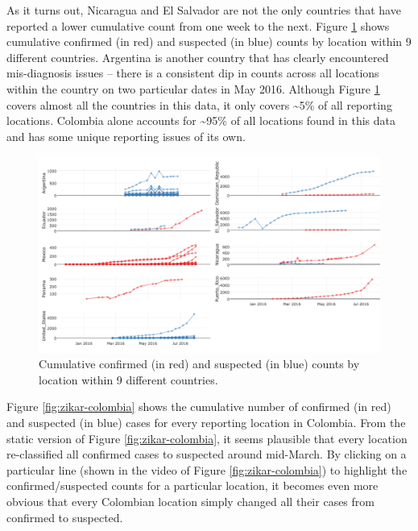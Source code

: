 \documentclass[12pt,]{article}
\theoremstyle{definition}
\theoremstyle{definition}
\theoremstyle{remark}
\begin{document}
As it turns out, Nicaragua and El Salvador are not the only countries
that have reported a lower cumulative count from one week to the next.
Figure \ref{fig:zikar-cumulative} shows cumulative confirmed (in red)
and suspected (in blue) counts by location within 9 different countries.
Argentina is another country that has clearly encountered mis-diagnosis
issues -- there is a consistent dip in counts across all locations
within the country on two particular dates in May 2016. Although Figure
\ref{fig:zikar-cumulative} covers almost all the countries in this data,
it only covers \textasciitilde{}5\% of all reporting locations. Colombia
alone accounts for \textasciitilde{}95\% of all locations found in this
data and has some unique reporting issues of its own.

\begin{figure}
\centering
\includegraphics{images/zikar-cumulative}
\caption{\label{fig:zikar-cumulative}Cumulative confirmed (in red) and
suspected (in blue) counts by location within 9 different countries.}
\end{figure}

Figure \ref{fig:zikar-colombia} shows the cumulative number of confirmed
(in red) and suspected (in blue) cases for every reporting location in
Colombia. From the static version of Figure \ref{fig:zikar-colombia}, it
seems plausible that every location re-classified all confirmed cases to
suspected around mid-March. By clicking on a particular line (shown in
the video of Figure \ref{fig:zikar-colombia}) to highlight the
confirmed/suspected counts for a particular location, it becomes even
more obvious that every Colombian location simply changed all their
cases from confirmed to suspected.
\end{document}

